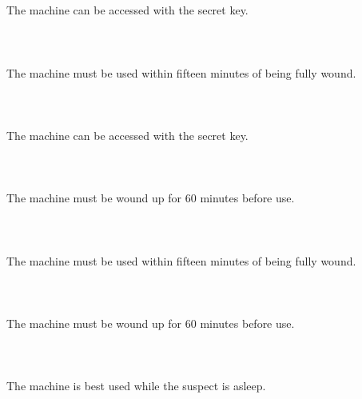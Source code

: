 \documentclass{article}
\begin{document}
    \section{}
    The machine can be accessed with the secret key.\\\\ 
    \newpage
    
    \section{}
    The machine must be used within fifteen minutes of being fully wound.\\\\ 
    \newpage
    
    \section{}
    The machine can be accessed with the secret key.\\\\ 
    \newpage
    
    \section{}
    The machine must be wound up for 60 minutes before use.\\\\ 
    \newpage
    
    \section{}
    The machine must be used within fifteen minutes of being fully wound.\\\\ 
    \newpage
    
    \section{}
    The machine must be wound up for 60 minutes before use.\\\\ 
    \newpage
    
    \section{}
    The machine is best used while the suspect is asleep.\\\\ 
    \newpage
    
\end{document}
